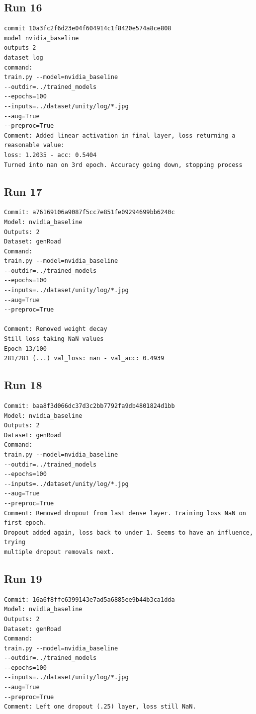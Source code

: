 \subsection{Run 16}

\begin{verbatim}
commit 10a3fc2f6d23e04f604914c1f8420e574a8ce808
model nvidia_baseline
outputs 2
dataset log
command:
train.py --model=nvidia_baseline
--outdir=../trained_models
--epochs=100
--inputs=../dataset/unity/log/*.jpg
--aug=True
--preproc=True
Comment: Added linear activation in final layer, loss returning a reasonable value:
loss: 1.2035 - acc: 0.5404
Turned into nan on 3rd epoch. Accuracy going down, stopping process
\end{verbatim}

\subsection{Run 17}

\begin{verbatim}
Commit: a76169106a9087f5cc7e851fe09294699bb6240c 
Model: nvidia_baseline
Outputs: 2
Dataset: genRoad
Command: 
train.py --model=nvidia_baseline
--outdir=../trained_models
--epochs=100
--inputs=../dataset/unity/log/*.jpg
--aug=True
--preproc=True

Comment: Removed weight decay
Still loss taking NaN values
Epoch 13/100
281/281 (...) val_loss: nan - val_acc: 0.4939

\end{verbatim}

\subsection{Run 18 }

\begin{verbatim}
Commit: baa8f3d066dc37d3c2bb7792fa9db4801824d1bb 
Model: nvidia_baseline
Outputs: 2
Dataset: genRoad
Command: 
train.py --model=nvidia_baseline
--outdir=../trained_models
--epochs=100
--inputs=../dataset/unity/log/*.jpg
--aug=True
--preproc=True
Comment: Removed dropout from last dense layer. Training loss NaN on first epoch.
Dropout added again, loss back to under 1. Seems to have an influence, trying
multiple dropout removals next.

\end{verbatim}



\subsection{Run 19}
\begin{verbatim}
Commit: 16a6f8ffc6399143e7ad5a6885ee9b44b3ca1dda
Model: nvidia_baseline
Outputs: 2
Dataset: genRoad
Command: 
train.py --model=nvidia_baseline
--outdir=../trained_models
--epochs=100
--inputs=../dataset/unity/log/*.jpg
--aug=True
--preproc=True
Comment: Left one dropout (.25) layer, loss still NaN.
\end{verbatim}

